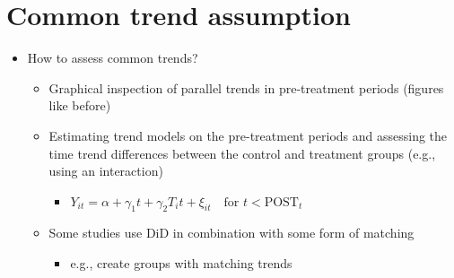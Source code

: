\documentclass[10pt]{article}
\begin{document}
\section{Common trend assumption}
\begin{itemize}
    \item How to assess common trends?
    \begin{itemize}
        \item Graphical inspection of parallel trends in pre-treatment periods (figures like before)
        \item Estimating trend models on the pre-treatment periods and assessing the time trend differences between the control and treatment groups (e.g., using an interaction)
        \begin{itemize}
            \item $Y_{it} = \alpha + \gamma_1t + \gamma_2T_it + \xi_{it}\quad \text{for }t < \text{POST}_t $
        \end{itemize}
        \item Some studies use DiD in combination with some form of matching 
        \begin{itemize}
            \item e.g., create groups with matching trends 
        \end{itemize}
    \end{itemize}
\end{itemize}
\end{document}
